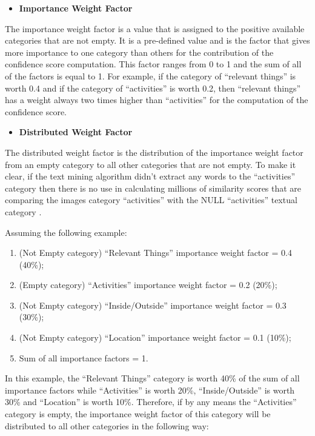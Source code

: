     \newpage
    \begin{itemize}
      \item \textbf{Importance Weight Factor}
    \end{itemize}

    The importance weight factor is a value that is assigned to the positive available categories that are not empty. It is a pre-defined value and is the factor that gives more importance to one category than others for the contribution of the confidence score computation. This factor ranges from 0 to 1 and the sum of all of the factors is equal to 1. For example, if the category of \enquote{relevant things} is worth 0.4 and if the category of \enquote{activities} is worth 0.2, then \enquote{relevant things} has a weight always two times higher than \enquote{activities} for the computation of the confidence score.

    \begin{itemize}
      \item \textbf{Distributed Weight Factor}
    \end{itemize}

    The distributed weight factor is the distribution of the importance weight factor from an empty category to all other categories that are not empty. To make it clear, if the text mining algorithm didn't extract any words to the \enquote{activities} category then there is no use in calculating millions of similarity scores that are comparing the images category \enquote{activities} with the NULL \enquote{activities} textual category . 

        
   Assuming the following example:
   \begin{enumerate}
    \item (Not Empty category) \enquote{Relevant Things} importance weight factor = 0.4 (40\%);
    \item (Empty category) \enquote{Activities} importance weight factor =  0.2 (20\%);
    \item (Not Empty category) \enquote{Inside/Outside} importance weight factor = 0.3 (30\%);
    \item (Not Empty category) \enquote{Location} importance weight factor = 0.1 (10\%);
    \item Sum of all importance factors = 1.
   \end{enumerate}

   In this example, the \enquote{Relevant Things} category is worth 40\% of the sum of all importance factors while \enquote{Activities} is worth 20\%, \enquote{Inside/Outside} is worth 30\% and \enquote{Location} is worth 10\%. Therefore, if by any means the \enquote{Activities} category is empty, the importance weight factor of this category will be distributed to all other categories in the following way:

